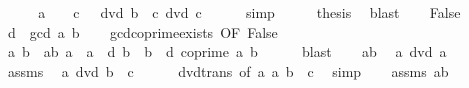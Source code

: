 \begin{isabellebody}
\ \ \isamarkupfalse%
\ \isamarkupfalse%
\ {\isachardoublequoteopen}a\ {\isacharequal}{\kern0pt}\ {}\ {\isacharasterisk}{\kern0pt}\ c\ {\isasymand}\ {}\ dvd\ b\ {\isasymand}\ c\ dvd\ c{\isachardoublequoteclose}\isanewline
\ \ \ \ \isamarkupfalse%
\ simp\isanewline
\ \ \isamarkupfalse%
\ \isamarkupfalse%
\ {\isacharquery}{\kern0pt}thesis\ \isamarkupfalse%
\ blast\isanewline
{}\isamarkupfalse%
\isanewline
\ \ \isamarkupfalse%
\ False\isanewline
\ \ \isamarkupfalse%
\ {\isacharquery}{\kern0pt}d\ {\isacharequal}{\kern0pt}\ {\isachardoublequoteopen}gcd\ a\ b{\isachardoublequoteclose}\isanewline
\ \ \isamarkupfalse%
\ gcd{\isacharunderscore}{\kern0pt}coprime{\isacharunderscore}{\kern0pt}exists\ {\isacharbrackleft}{\kern0pt}OF\ False{\isacharbrackright}{\kern0pt}\isanewline
\ \ \ \ \isamarkupfalse%
\ a{\isacharprime}{\kern0pt}\ b{\isacharprime}{\kern0pt}\ \ ab{\isacharprime}{\kern0pt}{\isacharcolon}{\kern0pt}\ {\isachardoublequoteopen}a\ {\isacharequal}{\kern0pt}\ a{\isacharprime}{\kern0pt}\ {\isacharasterisk}{\kern0pt}\ {\isacharquery}{\kern0pt}d{\isachardoublequoteclose}\ {\isachardoublequoteopen}b\ {\isacharequal}{\kern0pt}\ b{\isacharprime}{\kern0pt}\ {\isacharasterisk}{\kern0pt}\ {\isacharquery}{\kern0pt}d{\isachardoublequoteclose}\ {\isachardoublequoteopen}coprime\ a{\isacharprime}{\kern0pt}\ b{\isacharprime}{\kern0pt}{\isachardoublequoteclose}\isanewline
\ \ \ \ \isamarkupfalse%
\ blast\isanewline
\ \ \isamarkupfalse%
\ ab{\isacharprime}{\kern0pt}{\isacharparenleft}{\kern0pt}{}{\isacharparenright}{\kern0pt}\ \isamarkupfalse%
\ {\isachardoublequoteopen}a{\isacharprime}{\kern0pt}\ dvd\ a{\isachardoublequoteclose}\ \isacommand{{\isachardot}{\kern0pt}{\isachardot}{\kern0pt}}\isamarkupfalse%
\isanewline
\ \ \isamarkupfalse%
\ assms\ \isamarkupfalse%
\ {\isachardoublequoteopen}a{\isacharprime}{\kern0pt}\ dvd\ b\ {\isacharasterisk}{\kern0pt}\ c{\isachardoublequoteclose}\isanewline
\ \ \ \ \isamarkupfalse%
\ dvd{\isacharunderscore}{\kern0pt}trans\ {\isacharbrackleft}{\kern0pt}of\ a{\isacharprime}{\kern0pt}\ a\ {\isachardoublequoteopen}b\ {\isacharasterisk}{\kern0pt}\ c{\isachardoublequoteclose}{\isacharbrackright}{\kern0pt}\ \isamarkupfalse%
\ simp\isanewline
\ \ \isamarkupfalse%
\ assms\ ab{\isacharprime}{\kern0pt}{\isacharparenleft}{\kern0pt}{}{\isacharcomma}{\kern0pt}{}{\isacharparenright}{\kern0pt}\ \isamarkupfalse%

\end{isabellebody}
